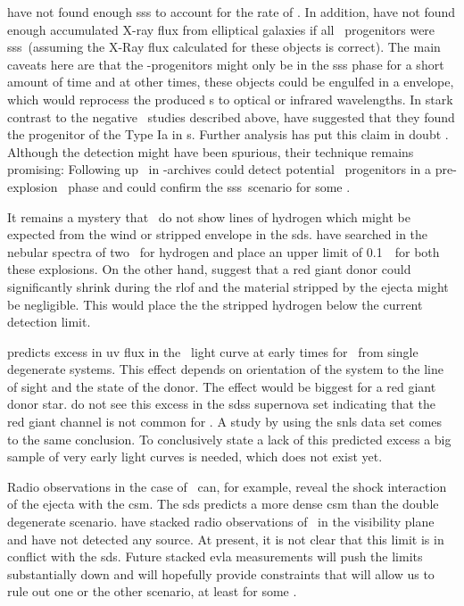 \cite{2010ApJ...719..474D} have not found enough \gls{sss} to account for the rate of \sneia. In addition, \cite{2010Natur.463..924G} have not found enough accumulated X-ray flux from elliptical galaxies if all \snia~progenitors were \gls{sss}\ (assuming the X-Ray flux calculated for these objects is correct). The main caveats here are that the \snia-progenitors might only be in the \gls{sss} phase for a short amount of time and at other times, these objects could be engulfed in a envelope, which would reprocess the produced \xray s to optical or infrared wavelengths. In stark contrast to the negative \xray~studies described above, \citet{2008Natur.451..802V} have suggested that they found the progenitor of the Type Ia  in \xray s. Further analysis has put this claim in doubt \citep{2008MNRAS.391..290R}. Although the detection might have been spurious, their technique remains promising: Following up \sneia\ in \xray-archives could detect potential \sneia\ progenitors in a pre-explosion \xray\ phase and could confirm the \gls{sss}~scenario for some \sneia.

It remains a mystery that \sneia\ do not show lines of hydrogen which might be expected from the wind or stripped envelope in the \gls{sds}. \citet{2007ApJ...670.1275L} have searched in the nebular spectra of two \sneia\ for hydrogen and place an upper limit of 0.1~\msun\ for both these explosions. On the other hand, \citet{2011ApJ...730L..34J} suggest that a red giant donor could significantly shrink during the \gls{rlof} and the material stripped by the ejecta might be negligible. This would place the the stripped hydrogen below the current detection limit. 

\cite{2010ApJ...708.1025K} predicts excess in \gls*{uv} flux in the \snia\ light curve at early times for \snia\ from single degenerate systems. This effect depends on orientation of the system to the line of sight and the state of the donor. The effect would be biggest for a red giant donor star. \cite{2010ApJ...722.1691H} do not see this excess in the \gls{sdss} supernova set indicating that the red giant channel is not common for \sneia. A study by \cite{2011arXiv1106.4008B} using the \gls{snls} data set comes to the same conclusion. To conclusively state a lack of this predicted excess a big sample of very early light curves is needed, which does not exist yet.

Radio observations in the case of \sneia\ can, for example, reveal the shock interaction of the ejecta with the \gls{csm}. The \gls{sds} predicts a more dense \gls{csm} than the double degenerate scenario. \citet{2011arXiv1105.6188H} have stacked radio observations of \sneia\ in the visibility plane and have not detected any source. At present, it is not clear that this limit is in conflict with the \gls{sds}. Future stacked \gls{evla} measurements will push the limits substantially down and will hopefully provide constraints that will allow us to rule out one or the other scenario, at least for some \sneia.


